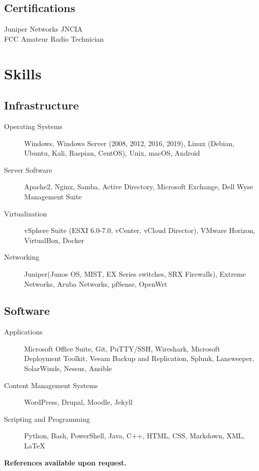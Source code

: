 \documentclass{article}
\begin{document}
\begin{samepage}
\begin{minipage}[t]{.35\textwidth}
	\subsection*{Certifications}
	Juniper Networks JNCIA \\
	FCC Amateur Radio Technician
\end{minipage}%

\section{Skills}

\subsection{Infrastructure}
\begin{description}
\item[Operating Systems] Windows, Windows Server (2008, 2012, 2016, 2019), Linux (Debian, Ubuntu, Kali, Raspian, CentOS), Unix,  macOS, Android
\item[Server Software] Apache2, Nginx, Samba, Active Directory, Microsoft Exchange, Dell Wyse Management Suite
\item[Virtualization] vSphere Suite (ESXI 6.0-7.0, vCenter, vCloud Director), VMware Horizon, VirtualBox, Docker
\item[Networking] Juniper(Junos OS, MIST, EX Series switches, SRX Firewalls), Extreme Networks, Aruba Networks, pfSense, OpenWrt
\end{description}

\subsection{Software}

\begin{description}
\item[Applications] Microsoft Office Suite, Git, PuTTY/SSH, Wireshark, Microsoft Deployment Toolkit, Veeam Backup and Replication, Splunk, Lansweeper, SolarWinds, Nessus, Ansible
\item[Content Management Systems] WordPress, Drupal, Moodle, Jekyll
\item[Scripting and Programming] Python, Bash, PowerShell, Java, C++, HTML, CSS, Markdown, XML, {\LaTeX}
\end{description}


\begin{center}
\textbf{References available upon request.}
\end{center}

\thispagestyle{empty}
\end{samepage}
\end{document}
